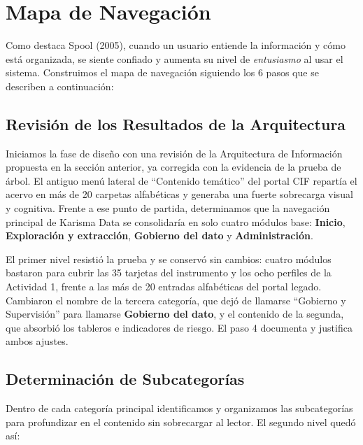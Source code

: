 \section{Mapa de Navegación}

Como destaca Spool (2005), cuando un usuario entiende la información y cómo está organizada, se siente confiado y aumenta su nivel de \textit{entusiasmo} al usar el sistema. Construimos el mapa de navegación siguiendo los 6 pasos que se describen a continuación:

\subsection{Revisión de los Resultados de la Arquitectura}
Iniciamos la fase de diseño con una revisión de la Arquitectura de Información propuesta en la sección anterior, ya corregida con la evidencia de la prueba de árbol. El antiguo menú lateral de ``Contenido temático'' del portal CIF repartía el acervo en más de 20 carpetas alfabéticas y generaba una fuerte sobrecarga visual y cognitiva. Frente a ese punto de partida, determinamos que la navegación principal de Karisma Data se consolidaría en solo cuatro módulos base: \textbf{Inicio}, \textbf{Exploración y extracción}, \textbf{Gobierno del dato} y \textbf{Administración}.

El primer nivel resistió la prueba y se conservó sin cambios: cuatro módulos bastaron para cubrir las 35 tarjetas del instrumento y los ocho perfiles de la Actividad 1, frente a las más de 20 entradas alfabéticas del portal legado. Cambiaron el nombre de la tercera categoría, que dejó de llamarse ``Gobierno y Supervisión'' para llamarse \textbf{Gobierno del dato}, y el contenido de la segunda, que absorbió los tableros e indicadores de riesgo. El paso 4 documenta y justifica ambos ajustes.

\subsection{Determinación de Subcategorías}
Dentro de cada categoría principal identificamos y organizamos las subcategorías para profundizar en el contenido sin sobrecargar al lector. El segundo nivel quedó así:


